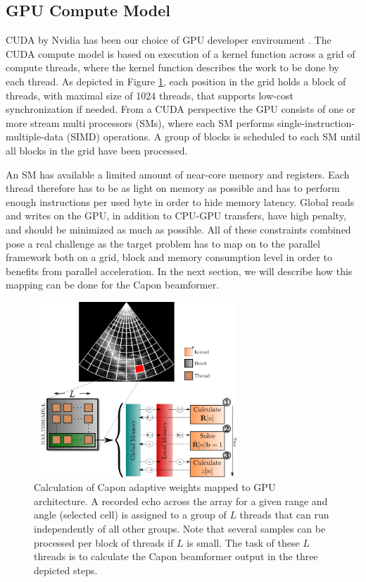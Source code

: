 \documentclass[conference]{IEEEtran}
\begin{document}
\subsection{GPU Compute Model}
CUDA by Nvidia has been our choice of GPU developer environment \cite{Nvidia2011}. The CUDA compute model is based on execution of a kernel function across a grid of compute threads, where the kernel function describes the work to be done by each thread. As depicted in Figure \ref{fig:gpulayout}, each position in the grid holds a block of threads, with maximal size of 1024 threads, that supports low-cost synchronization if needed. 
From a CUDA perspective the GPU consists of one or more stream multi processors (SMs), where each SM performs single-instruction-multiple-data (SIMD) operations. A group of blocks is scheduled to each SM until all blocks in the grid have been processed. 

An SM has available a limited amount of near-core memory and registers. Each thread therefore has to be as light on memory as possible and has to perform enough instructions per used byte in order to hide memory latency. Global reads and writes on the GPU, in addition to CPU-GPU transfers, have high penalty, and should be minimized as much as possible. All of these constraints combined pose a real challenge as the target problem has to map on to the parallel framework both on a grid, block and memory consumption level in order to benefits from parallel acceleration. In the next section, we will describe how this mapping can be done for the Capon beamformer.    

\begin{figure}
\centerline{\includegraphics[width=3in]{gfx/gpu_layout_vertical_lr.png}}
\caption{Calculation of Capon adaptive weights mapped to GPU architecture. A recorded echo across the array for a given range and angle (selected cell) is assigned to a group of $L$ threads that can run independently of all other groups. Note that several samples can be processed per block of threads if $L$ is small. The task of these $L$ threads is to calculate the Capon beamformer output in the three depicted steps.}
\label{fig:gpulayout}
\end{figure}
\end{document}
